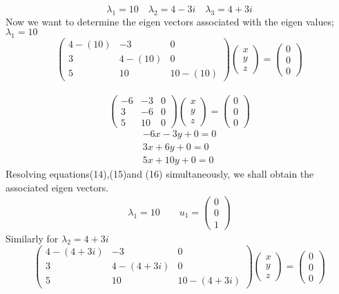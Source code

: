 \documentclass[12pt,a4paper]{article}
\begin{document}
\begin{itemize}
\begin{itemize}
$$\lambda_{1}=10\quad \lambda_{2}=4-3i\quad\lambda_{3}=4+3i$$
Now we want to determine the eigen vectors associated with the eigen values;\\
$\lambda_{1}=10$
\[
\begin{pmatrix} 4-\left(10\right) & -3 & 0 \\  3& 4-\left(10\right) & 0\\5&10 &10-\left(10\right) \end{pmatrix} \begin{pmatrix} x \\ y \\z \end{pmatrix}=\begin{pmatrix} 0 \\ 0 \\0 \end{pmatrix}\]\\
\[
\begin{pmatrix} -6 & -3 & 0 \\ 3 & -6 & 0\\5 &10 &0 \end{pmatrix} \begin{pmatrix} x \\ y \\z \end{pmatrix}=\begin{pmatrix} 0 \\ 0 \\0 \end{pmatrix}\]
\begin{align}
-6x-3y+0=0\\
3x+6y+0=0\\
5x+10y+0=0
\end{align}
Resolving equations(14),(15)and (16) simultaneously, we shall obtain the associated eigen vectors.\\

\begin{align*}
\lambda_{1}=10\quad \quad u_{1}=
\begin{pmatrix} 0 \\ 0 \\1 \end{pmatrix}
\end{align*}
Similarly for $\lambda_{2}=4+3i$\\

\[
\begin{pmatrix} 4-\left(4+3i\right) & -3 & 0 \\  3& 4-\left(4+3i\right) & 0\\5&10 &10-\left(4+3i\right) \end{pmatrix} \begin{pmatrix} x \\ y \\z \end{pmatrix}=\begin{pmatrix} 0 \\ 0 \\0 \end{pmatrix}\]


\end{itemize}
\end{itemize}
\end{document}
